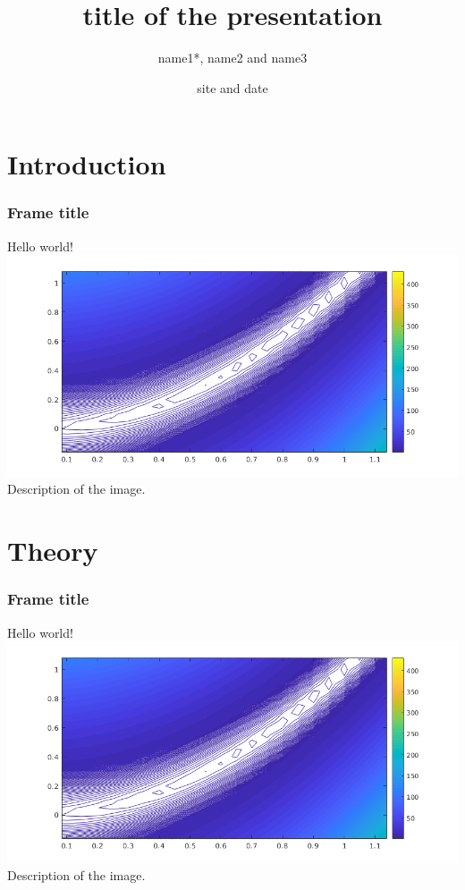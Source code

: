 \documentclass[aspectratio=169]{beamer}
\title{title of the presentation}
\author[name1,name2,name3]{name1*, name2 and name3}
\date[site]{site and date}
\begin{document}
\begin{frame}
 \titlepage 
\end{frame}


\section{Introduction}
\begin{frame}
 \frametitle{Frame title}
 Hello world!\\
 \includegraphics[scale=0.5]{images/rosenbrockzoom.png}\\
 Description of the image.
\end{frame}

\section{Theory}
\begin{frame}
 \frametitle{Frame title}
 Hello world!\\
 \includegraphics[scale=0.5]{images/rosenbrockzoom.png}\\
 Description of the image.
\end{frame}
\end{document}
